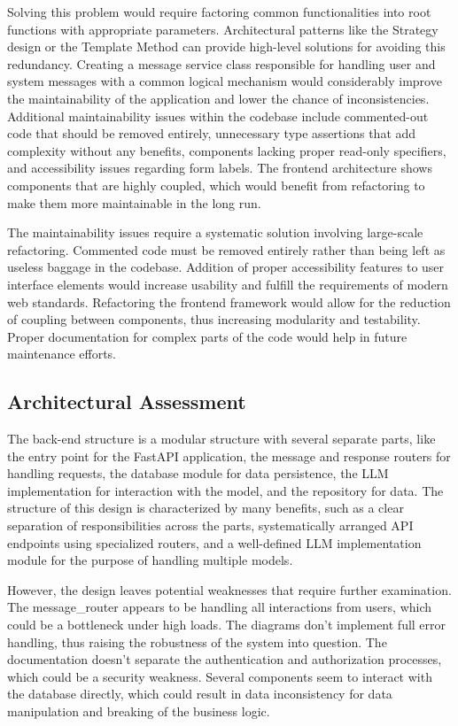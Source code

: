 \documentclass[sigconf]{acmart}
\begin{document}
Solving this problem would require factoring common functionalities into root functions with appropriate parameters. Architectural patterns like the Strategy design or the Template Method can provide high-level solutions for avoiding this redundancy. Creating a message service class responsible for handling user and system messages with a common logical mechanism would considerably improve the maintainability of the application and lower the chance of inconsistencies. Additional maintainability issues within the codebase include commented-out code that should be removed entirely, unnecessary type assertions that add complexity without any benefits, components lacking proper read-only specifiers, and accessibility issues regarding form labels. The frontend architecture shows components that are highly coupled, which would benefit from refactoring to make them more maintainable in the long run.

The maintainability issues require a systematic solution involving large-scale refactoring. Commented code must be removed entirely rather than being left as useless baggage in the codebase. Addition of proper accessibility features to user interface elements would increase usability and fulfill the requirements of modern web standards. Refactoring the frontend framework would allow for the reduction of coupling between components, thus increasing modularity and testability. Proper documentation for complex parts of the code would help in future maintenance efforts.

\subsection{Architectural Assessment}
The back-end structure is a modular structure with several separate parts, like the entry point for the FastAPI application, the message and response routers for handling requests, the database module for data persistence, the LLM implementation for interaction with the model, and the repository for data. The structure of this design is characterized by many benefits, such as a clear separation of responsibilities across the parts, systematically arranged API endpoints using specialized routers, and a well-defined LLM implementation module for the purpose of handling multiple models.

However, the design leaves potential weaknesses that require further examination. The message\_router appears to be handling all interactions from users, which could be a bottleneck under high loads. The diagrams don't implement full error handling, thus raising the robustness of the system into question. The documentation doesn't separate the authentication and authorization processes, which could be a security weakness. Several components seem to interact with the database directly, which could result in data inconsistency for data manipulation and breaking of the business logic.
\end{document}
